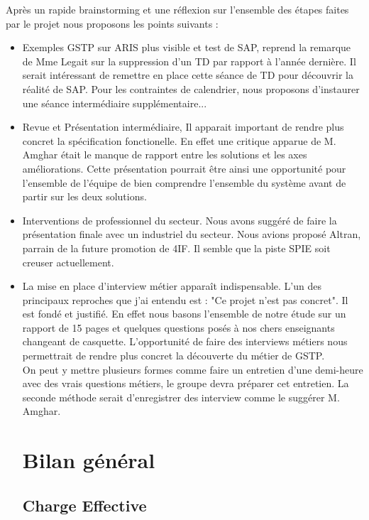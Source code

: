 Après un rapide brainstorming et une réflexion sur l'ensemble des étapes faites 
par le projet nous proposons les points suivants : 

\begin{itemize}
\item Exemples GSTP sur ARIS plus visible et test de SAP, reprend la remarque 
de Mme Legait sur la suppression d'un TD par rapport à l'année dernière. 
Il serait intéressant de remettre en place cette séance de TD pour découvrir 
la réalité de SAP.
Pour les contraintes de calendrier, nous proposons d'instaurer une séance 
intermédiaire supplémentaire...
\item Revue et Présentation intermédiaire, Il apparait important de rendre plus
concret la spécification fonctionelle. En effet une critique apparue de M. Amghar
était le manque de rapport entre les solutions et les axes améliorations. Cette
présentation pourrait être ainsi une opportunité pour l'ensemble de l'équipe de 
bien comprendre l'ensemble du système avant de partir sur les deux solutions.
\item Interventions de professionnel du secteur. Nous avons suggéré de faire 
la présentation finale avec un industriel du secteur. Nous avions proposé Altran, 
parrain de la future promotion de 4IF. Il semble que la piste SPIE soit creuser 
actuellement.
\item La mise en place d'interview métier apparaît indispensable. L'un des principaux
reproches que j'ai entendu est : "Ce projet n'est pas concret". Il est fondé et justifié.
 En effet nous basons l'ensemble de notre étude sur un rapport de 15 pages et quelques
questions posés à nos chers enseignants changeant de casquette. L'opportunité de faire
des interviews métiers nous permettrait de rendre plus concret la découverte du métier
de GSTP. \\
On peut y mettre plusieurs formes comme faire un entretien d'une demi-heure avec 
des vrais questions métiers, le groupe devra préparer cet entretien. La seconde
méthode serait d'enregistrer des interview comme le suggérer M. Amghar.

\section{Bilan général}

\subsection{Charge Effective}



\end{itemize}

